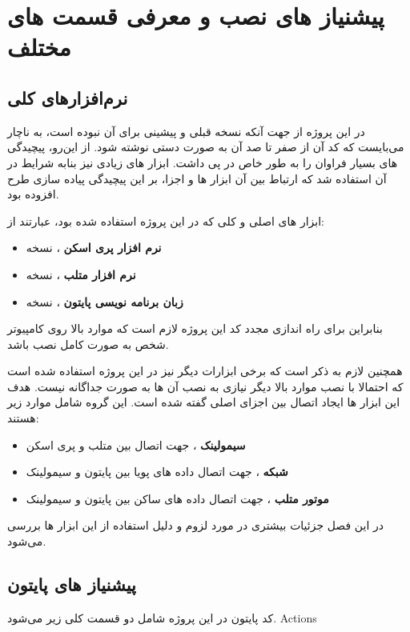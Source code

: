 \chapter{پیشنیاز های نصب و معرفی قسمت های مختلف}\label{ch:req}

\section{نرم‌افزار‌های کلی}
در این پروژه از جهت آنکه نسخه قبلی و پیشینی برای  آن نبوده است، به ناچار می‌بایست که کد آن از صفر تا صد آن به صورت دستی نوشته شود. از این‌رو، پیچیدگی های بسیار فراوان را به طور خاص در پی داشت. ابزار های زیادی نیز بنابه شرایط در آن استفاده شد که ارتباط بین آن ابزار ها و اجزا، بر این پیچیدگی پیاده سازی طرح افزوده بود.

ابزار های اصلی و کلی که در این پروژه استفاده شده بود، عبارتند از:

\begin{itemize}
	\item 
	\textbf{نرم افزار پری اسکن}
	، نسخه 
	
	\item 
	\textbf{نرم افزار متلب}
	، نسخه 
	\item 
	\textbf{زبان برنامه نویسی پایتون}
	، نسخه 
\end{itemize}

بنابراین برای راه اندازی مجدد کد این پروژه لازم است که موارد بالا روی کامپیوتر شخص به صورت کامل نصب باشد.

همچنین لازم به ذکر است که برخی ابزارات دیگر نیز در این پروژه استفاده شده است که احتمالا با نصب موارد بالا دیگر نیازی به نصب آن ها به صورت جداگانه نیست. هدف این ابزار ها ایجاد اتصال بین اجزای اصلی گفته شده است. این گروه شامل موارد زیر هستند:

\begin{itemize}
	\item 
	\textbf{سیمولینک}
	، جهت اتصال بین متلب و پری اسکن
	
	\item 
	\textbf{شبکه }
	، جهت اتصال داده های پویا 
	بین پایتون و سیمولینک
	
	\item 
	\textbf{موتور متلب}
	\LTRfootnote{\matlabengine}
	، جهت اتصال داده های ساکن
	بین پایتون و سیمولینک
\end{itemize}

در این فصل جزئیات بیشتری در مورد لزوم و دلیل استفاده از این ابزار ها بررسی می‌شود.




\section{پیشنیاز های پایتون}

کد پایتون در این پروژه شامل دو قسمت کلی زیر می‌شود.
\glspl{Action}

















